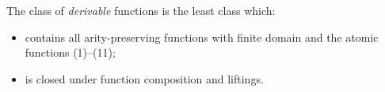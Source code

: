 \newcommand{\simplefun}[4]{
    \begin{tabular}{cc}
        $\ranked{
        \xymatrix@C=1.5cm{
#2 \ar[r]^-{#1}& #3
        }}$
        \\
        {#4}
    \end{tabular}   
 }

 \newcommand{\reversiblefun}[4]{
    \begin{tabular}{cc}
        $\ranked{
        \xymatrix@C=1.5cm{
#2 \ar@<.5ex>[r]^-{#1}& #3
\ar@<.5ex>[l]
        }}$
        \\
        {#4}
    \end{tabular}   
 }



 \newcommand{\laterfun}[3]{
    \begin{tabular}{cc}
        $\ranked{
        \xymatrix@C=1.5cm{
#1 & #2
        }}$
        \\
#3
    \end{tabular}   
 }
 
\begin{definition}
    The class of \emph{derivable} functions is the least class which:
    \begin{itemize}
        \item contains all arity-preserving functions with finite domain and  the atomic functions (1)--(11);
        \item is closed under function composition and liftings.
    \end{itemize}
\end{definition}

